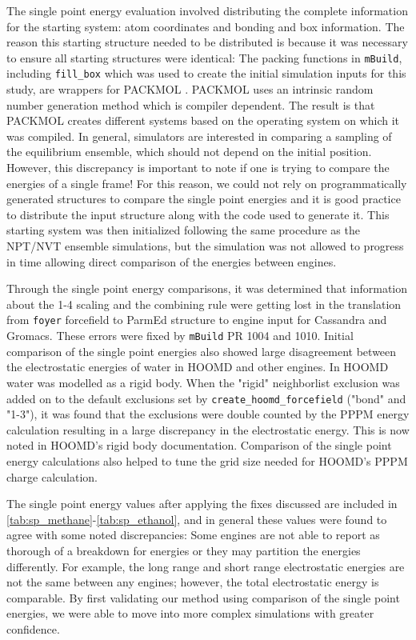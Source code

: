 The single point energy evaluation involved distributing the complete information for the starting system: atom coordinates and bonding and box information. 
The reason this starting structure needed to be distributed is because it was necessary to ensure all starting structures were identical:
The packing functions in \texttt{mBuild}, including \lstinline{fill_box} which was used to create the initial simulation inputs for this study, are wrappers for PACKMOL \citep{Martinez2003, Martinez2009}.
PACKMOL uses an intrinsic random number generation method which is compiler dependent. 
The result is that PACKMOL creates different systems based on the operating system on which it was compiled.
In general, simulators are interested in comparing a sampling of the equilibrium ensemble, which should not depend on the initial position.
However, this discrepancy is important to note if one is trying to compare the energies of a single frame!
For this reason, we could not rely on programmatically generated structures to compare the single point energies and it is good practice to distribute the input structure along with the code used to generate it.
This starting system was then initialized following the same procedure as the NPT/NVT ensemble simulations, but the simulation was not allowed to progress in time allowing direct comparison of the energies between engines.

Through the single point energy comparisons, it was determined that information about the 1-4 scaling and the combining rule were getting lost in the translation from \texttt{foyer} forcefield to ParmEd structure to engine input for Cassandra and Gromacs.
These errors were fixed by \texttt{mBuild} PR 1004 and 1010.
Initial comparison of the single point energies also showed large disagreement between the electrostatic energies of water in HOOMD and other engines. 
In HOOMD water was modelled as a rigid body. 
When the "rigid" neighborlist exclusion was added on to the default exclusions set by \lstinline{create_hoomd_forcefield} ("bond" and "1-3"), it was found that the exclusions were double counted by the PPPM energy calculation resulting in a large discrepancy in the electrostatic energy.
This is now noted in HOOMD's rigid body documentation.
Comparison of the single point energy calculations also helped to tune the grid size needed for HOOMD's PPPM charge calculation. 

The single point energy values after applying the fixes discussed are included in \autoref{tab:sp_methane}-\autoref{tab:sp_ethanol}, and in general these values were found to agree with some noted discrepancies:
Some engines are not able to report as thorough of a breakdown for energies or they may partition the energies differently.
For example, the long range and short range electrostatic energies are not the same between any engines; however, the total electrostatic energy is comparable.
By first validating our method using comparison of the single point energies, we were able to move into more complex simulations with greater confidence.

